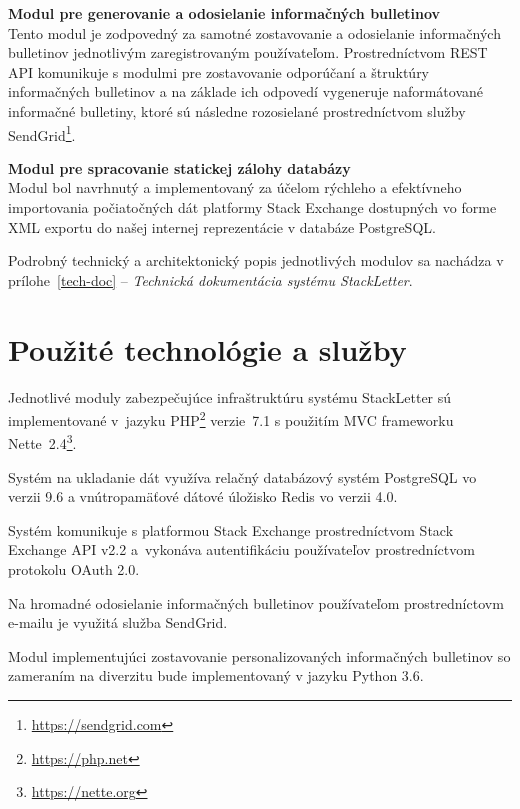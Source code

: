 \textbf{Modul pre generovanie a odosielanie informačných bulletinov}\\
Tento modul je zodpovedný za samotné zostavovanie a odosielanie informačných bulletinov jednotlivým zaregistrovaným
používateľom. Prostredníctvom REST API komunikuje s modulmi pre zostavovanie odporúčaní a štruktúry informačných bulletinov
a na základe ich odpovedí vygeneruje naformátované informačné bulletiny, ktoré sú následne rozosielané prostredníctvom služby
SendGrid\footnote{\url{https://sendgrid.com}}.

\textbf{Modul pre spracovanie statickej zálohy databázy}\\
Modul bol navrhnutý a implementovaný za účelom rýchleho a efektívneho importovania počiatočných dát platformy Stack Exchange
dostupných vo forme XML exportu do našej internej reprezentácie v databáze PostgreSQL.

Podrobný technický a architektonický popis jednotlivých modulov sa nachádza
v prílohe~\ref{tech-doc} -- \textit{Technická dokumentácia systému StackLetter}.

\section{Použité technológie a služby}

\begin{my_itemize}
\item{Jednotlivé moduly zabezpečujúce infraštruktúru systému StackLetter sú implementované v~jazyku PHP\footnote{\url{https://php.net}}
verzie~7.1 s použitím MVC frameworku Nette~2.4\footnote{\url{https://nette.org}}.}
\item{Systém na ukladanie dát využíva relačný databázový systém PostgreSQL vo verzii 9.6 a vnútropamäťové dátové úložisko Redis
vo verzii 4.0.}
\item{Systém komunikuje s platformou Stack Exchange prostredníctvom Stack Exchange API v2.2 a~vykonáva autentifikáciu
používateľov prostredníctvom protokolu OAuth 2.0.}
\item{Na hromadné odosielanie informačných bulletinov používateľom prostredníctovm e-mailu je využitá služba SendGrid.}
\item{Modul implementujúci zostavovanie personalizovaných informačných bulletinov so zameraním na diverzitu bude implementovaný
v jazyku Python 3.6.}
\end{my_itemize}

